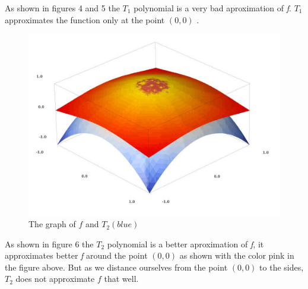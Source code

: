 \documentclass[a4paper,12pt]{article}
\begin{document}
As shown in figures 4 and 5 the $T_{1}$ polynomial is a very bad
aproximation of \emph{f}. $T_{1}$ approximates the function only at the point
$(0,0)$ .

\clearpage
\begin{figure}[H]
    \centering
    \includegraphics[scale=0.34]{2_f_t2_1.jpg}
    \caption{The graph of $f$ and $T_{2}(blue)$}
    \label{2_f_t2_1}
\end{figure}
\normalfont
 
As shown in figure 6 the $T_{2}$ polynomial is a better aproximation of
\emph{f}, it \newline
approximates better \emph{f} around
the point $(0,0)$ as shown with the color pink in the figure above.
But as we distance ourselves from the point $(0,0)$ to the sides, $T_{2}$ does not approximate $f$
that well.
\end{document}
